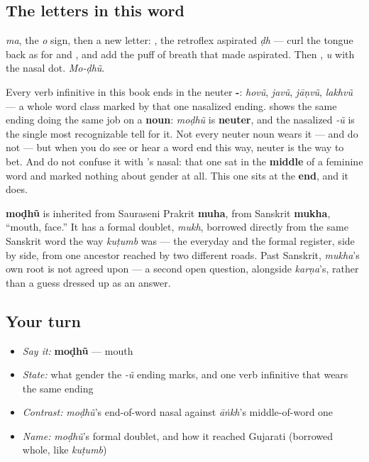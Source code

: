 \subsection*{The letters in this word}
\textbf{} \emph{ma}, \textbf{} the \emph{o} sign, then a new letter: \textbf{}, the retroflex aspirated \emph{ḍh} — curl the tongue back as for \textbf{} and \textbf{}, and add the puff of breath that made \textbf{} aspirated. Then \textbf{}, \emph{u} with the nasal dot. \emph{Mo-ḍhũ}.

\begin{grammarlens}[title={Grammar Lens: the neuter tell, named plainly}]
Every verb infinitive in this book ends in the neuter \textbf{-}: \emph{hovũ}, \emph{javũ}, \emph{jāṇvũ}, \emph{lakhvũ} — a whole word class marked by that one nasalized ending. \textbf{} shows the same ending doing the same job on a \textbf{noun}: \emph{moḍhũ} is \textbf{neuter}, and the nasalized \emph{-ũ} is the single most recognizable tell for it. Not every neuter noun wears it — \textbf{} and \textbf{} do not — but when you do see or hear a word end this way, neuter is the way to bet. And do not confuse it with \textbf{}'s nasal: that one sat in the \textbf{middle} of a feminine word and marked nothing about gender at all. This one sits at the \textbf{end}, and it does.
\end{grammarlens}

\begin{cousinweb}
\textbf{moḍhũ} is inherited from Sauraseni Prakrit \textbf{muha}, from Sanskrit \textbf{mukha}, \textquotedblleft{}mouth, face.\textquotedblright{} It has a formal doublet, \textbf{} \emph{mukh}, borrowed directly from the same Sanskrit word the way \emph{kuṭumb} was — the everyday and the formal register, side by side, from one ancestor reached by two different roads. Past Sanskrit, \emph{mukha}'s own root is not agreed upon — a second open question, alongside \emph{karṇa}'s, rather than a guess dressed up as an answer.
\end{cousinweb}

\subsection*{Your turn}
\begin{itemize}
\raggedright
  \item \emph{Say it:} \textbf{moḍhũ} — mouth
  \item \emph{State:} what gender the \emph{-ũ} ending marks, and one verb infinitive that wears the same ending
  \item \emph{Contrast:} \emph{moḍhũ}'s end-of-word nasal against \emph{āṅkh}'s middle-of-word one
  \item \emph{Name:} \emph{moḍhũ}'s formal doublet, and how it reached Gujarati (borrowed whole, like \emph{kuṭumb})
\end{itemize}

